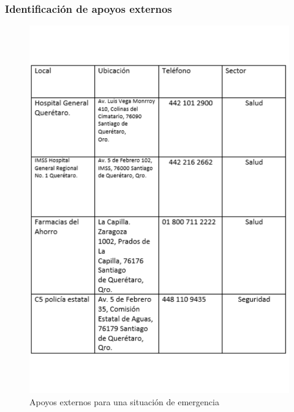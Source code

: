     \subsubsection{ Identificación de apoyos externos}
    \begin{figure}[H]
        \centering
        \includegraphics[scale=0.25]{30/img/apoyosExternos.pdf}
        \caption{Apoyos externos para una situación de emergencia}
    \end{figure}
    
